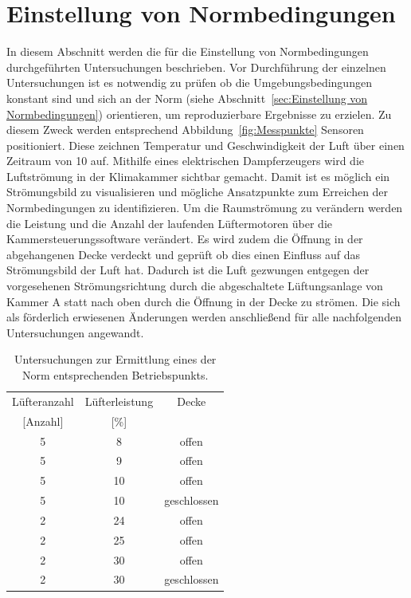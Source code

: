 


\section{Einstellung von Normbedingungen}
\label{sec:EinstellungvonNormbedingungen1}

In diesem Abschnitt werden die für die Einstellung von Normbedingungen durchgeführten Untersuchungen beschrieben.
Vor Durchführung der einzelnen Untersuchungen ist es notwendig zu prüfen ob die Umgebungsbedingungen konstant sind und sich an der Norm (siehe Abschnitt~\ref{sec:Einstellung von Normbedingungen}) orientieren, um reproduzierbare Ergebnisse zu erzielen. Zu diesem Zweck werden entsprechend Abbildung~\ref{fig:Messpunkte} Sensoren positioniert. Diese zeichnen Temperatur und Geschwindigkeit der Luft über einen Zeitraum von \unit{10}{\min} auf. Mithilfe eines elektrischen Dampferzeugers wird die Luftströmung in der Klimakammer sichtbar gemacht. Damit ist es möglich ein Strömungsbild zu visualisieren und mögliche Ansatzpunkte zum Erreichen der Normbedingungen zu identifizieren. Um die Raumströmung zu verändern werden die Leistung und die Anzahl der laufenden Lüftermotoren über die Kammersteuerungssoftware verändert. Es wird zudem die Öffnung in der abgehangenen Decke verdeckt und geprüft ob dies einen Einfluss auf das Strömungsbild der Luft hat. Dadurch ist die Luft gezwungen entgegen der vorgesehenen Strömungsrichtung durch die abgeschaltete Lüftungsanlage von Kammer A statt nach oben durch die Öffnung in der Decke zu strömen. Die sich als förderlich erwiesenen Änderungen werden anschließend für alle nachfolgenden Untersuchungen angewandt.

\begin{table}[h!]
\centering
\caption{Untersuchungen zur Ermittlung eines der Norm entsprechenden Betriebspunkts.}
\label{tab:Lüfterleistungen}
\begin{tabular}{|ccc|}
\hline
Lüfteranzahl            & Lüfterleistung          & Decke       \\
{[}Anzahl{]}            & {[}\%{]}                &             \\ \hline
\multicolumn{1}{|c|}{5} & \multicolumn{1}{c|}{8}  & offen       \\
\multicolumn{1}{|c|}{5} & \multicolumn{1}{c|}{9}  & offen       \\
\multicolumn{1}{|c|}{5} & \multicolumn{1}{c|}{10} & offen       \\
\multicolumn{1}{|c|}{5} & \multicolumn{1}{c|}{10} & geschlossen \\
\multicolumn{1}{|c|}{2} & \multicolumn{1}{c|}{24} & offen       \\
\multicolumn{1}{|c|}{2} & \multicolumn{1}{c|}{25} & offen       \\
\multicolumn{1}{|c|}{2} & \multicolumn{1}{c|}{30} & offen       \\
\multicolumn{1}{|c|}{2} & \multicolumn{1}{c|}{30} & geschlossen \\ \hline
\end{tabular}
\end{table}

